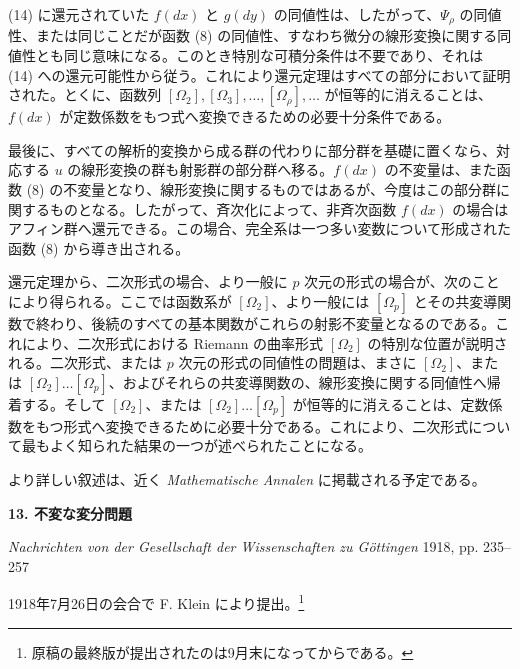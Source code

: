 \documentclass[11pt]{article}
\begin{document}
(14) に還元されていた \(f(dx)\) と \(g(dy)\) の同値性は、したがって、\(\Psi_\rho\) の同値性、または同じことだが函数 (8) の同値性、すなわち微分の線形変換に関する同値性とも同じ意味になる。このとき特別な可積分条件は不要であり、それは (14) への還元可能性から従う。これにより還元定理はすべての部分において証明された。とくに、函数列
\([\Omega_2],[\Omega_3],\ldots,[\Omega_\rho],\ldots\) が恒等的に消えることは、\(f(dx)\) が定数係数をもつ式へ変換できるための必要十分条件である。

最後に、すべての解析的変換から成る群の代わりに部分群を基礎に置くなら、対応する \(u\) の線形変換の群も射影群の部分群へ移る。\(f(dx)\) の不変量は、また函数 (8) の不変量となり、線形変換に関するものではあるが、今度はこの部分群に関するものとなる。したがって、斉次化によって、非斉次函数 \(f(dx)\) の場合はアフィン群へ還元できる。この場合、完全系は一つ多い変数について形成された函数 (8) から導き出される。

還元定理から、二次形式の場合、より一般に \(p\) 次元の形式の場合が、次のことにより得られる。ここでは函数系が \([\Omega_2]\)、より一般には \([\Omega_p]\) とその共変導関数で終わり、後続のすべての基本関数がこれらの射影不変量となるのである。これにより、二次形式における Riemann の曲率形式 \([\Omega_2]\) の特別な位置が説明される。二次形式、または \(p\) 次元の形式の同値性の問題は、まさに \([\Omega_2]\)、または \([\Omega_2]\ldots[\Omega_p]\)、およびそれらの共変導関数の、線形変換に関する同値性へ帰着する。そして \([\Omega_2]\)、または \([\Omega_2]\ldots[\Omega_p]\) が恒等的に消えることは、定数係数をもつ形式へ変換できるために必要十分である。これにより、二次形式について最もよく知られた結果の一つが述べられたことになる。

より詳しい叙述は、近く \emph{Mathematische Annalen} に掲載される予定である。

\clearpage

\begin{center}
{\Large\bfseries 13. 不変な変分問題}\par
\vspace{1.5em}
\emph{Nachrichten von der Gesellschaft der Wissenschaften zu Göttingen} 1918, pp. 235--257
\end{center}

\vspace{3em}
\begin{center}
1918年7月26日の会合で F. Klein により提出。\footnote{原稿の最終版が提出されたのは9月末になってからである。}
\end{center}
\end{document}
